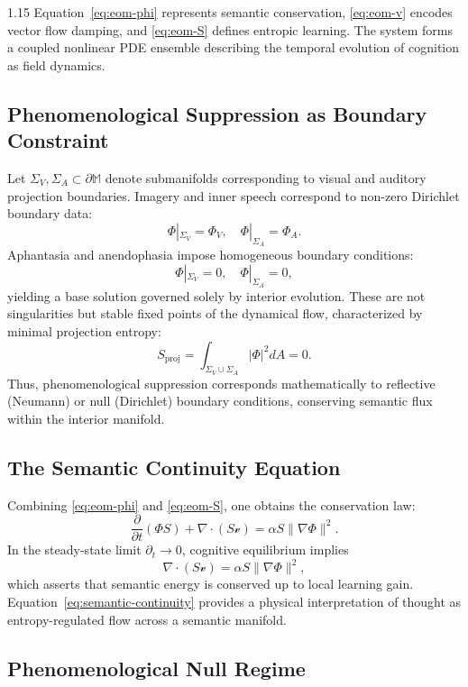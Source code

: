 \documentclass[12pt,a4paper]{article}
\begin{document}
\begin{spacing}{1.15}
Equation~\eqref{eq:eom-phi} represents semantic conservation, \eqref{eq:eom-v} encodes vector flow damping, and \eqref{eq:eom-S} defines entropic learning.
The system forms a coupled nonlinear PDE ensemble describing the temporal evolution of cognition as field dynamics.

\subsection{Phenomenological Suppression as Boundary Constraint}

Let \(\Sigma_V, \Sigma_A \subset \partial \mathbb{M}\) denote submanifolds corresponding to visual and auditory projection boundaries. Imagery and inner speech correspond to non-zero Dirichlet boundary data:
\[
\Phi|_{\Sigma_V} = \Phi_V, \quad \Phi|_{\Sigma_A} = \Phi_A.
\]
Aphantasia and anendophasia impose homogeneous boundary conditions:
\[
\Phi|_{\Sigma_V} = 0, \quad \Phi|_{\Sigma_A} = 0,
\]
yielding a base solution governed solely by interior evolution. These are not singularities but stable fixed points of the dynamical flow, characterized by minimal projection entropy:
\begin{equation}
S_{\text{proj}} = \int_{\Sigma_V \cup \Sigma_A} |\Phi|^2 dA = 0.
\end{equation}
Thus, phenomenological suppression corresponds mathematically to reflective (Neumann) or null (Dirichlet) boundary conditions, conserving semantic flux within the interior manifold.

\subsection{The Semantic Continuity Equation}

Combining \eqref{eq:eom-phi} and \eqref{eq:eom-S}, one obtains the conservation law:
\begin{equation}
\frac{\partial}{\partial t} (\Phi S)
 + \nabla \cdot (S \boldsymbol{\mathcal{v}})
 = \alpha S \|\nabla \Phi\|^2.
\label{eq:semantic-continuity}
\end{equation}
In the steady-state limit \(\partial_t \to 0\), cognitive equilibrium implies
\[
\nabla \cdot (S \boldsymbol{\mathcal{v}}) = \alpha S \|\nabla \Phi\|^2,
\]
which asserts that semantic energy is conserved up to local learning gain.
Equation~\eqref{eq:semantic-continuity} provides a physical interpretation of thought as entropy-regulated flow across a semantic manifold.

\subsection{Phenomenological Null Regime}


\end{spacing}
\end{document}
